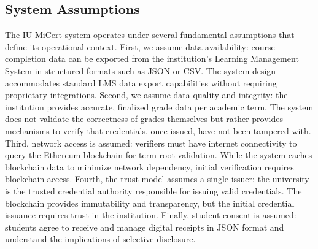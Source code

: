 \subsection{System Assumptions}
The IU-MiCert system operates under several fundamental assumptions that define its operational context. First, we assume data availability: course completion data can be exported from the institution's Learning Management System in structured formats such as JSON or CSV. The system design accommodates standard LMS data export capabilities without requiring proprietary integrations. Second, we assume data quality and integrity: the institution provides accurate, finalized grade data per academic term. The system does not validate the correctness of grades themselves but rather provides mechanisms to verify that credentials, once issued, have not been tampered with. Third, network access is assumed: verifiers must have internet connectivity to query the Ethereum blockchain for term root validation. While the system caches blockchain data to minimize network dependency, initial verification requires blockchain access. Fourth, the trust model assumes a single issuer: the university is the trusted credential authority responsible for issuing valid credentials. The blockchain provides immutability and transparency, but the initial credential issuance requires trust in the institution. Finally, student consent is assumed: students agree to receive and manage digital receipts in JSON format and understand the implications of selective disclosure.

